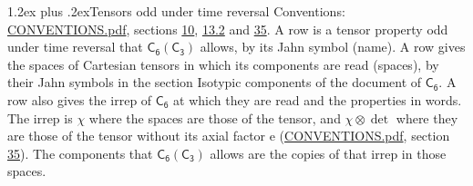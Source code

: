 \documentclass[10pt,a4paper]{article}
\makeatletter
\renewcommand\section{\@startsection{section}{1}{\z@}{-3ex plus -1ex minus -.2ex}%
  {1.2ex plus .2ex}{\normalfont\large\sffamily\bfseries\color{parttitle}}}
\numberwithin{equation}{section}
\newcommand{\grp}[1]{\mathsf{#1}}
\newcommand{\irrprod}{\otimes}
\makeatother
\begin{document}
\section{Tensors odd under time reversal}\label{s:time_odd}
Conventions: \href{../../CONVENTIONS.pdf}{CONVENTIONS.pdf}, sections \href{../../../rotation/CONVENTIONS.pdf\#conv.10}{10}, \href{../../../rotation/CONVENTIONS.pdf\#conv.13.2}{13.2} and \href{../../CONVENTIONS.pdf\#conv.35}{35}.
\leavevmode\label{n:head.name.property}A row is a tensor property odd under time reversal that $\grp{C_{6}}(\grp{C_{3}})$ allows, by its Jahn symbol (name). \label{n:head.spaces}A row gives the spaces of Cartesian tensors in which its components are read (spaces), by their Jahn symbols in the section Isotypic components of the document of \href{../../../rotation/data/pdf/C6.pdf}{$\grp{C_{6}}$}. \label{n:head.properties}A row also gives the irrep of $\grp{C_{6}}$ at which they are read and the properties in words. The irrep is $\chi$ where the spaces are those of the tensor, and $\chi \irrprod \det$ where they are those of the tensor without its axial factor e (\href{../../CONVENTIONS.pdf}{CONVENTIONS.pdf}, section \href{../../CONVENTIONS.pdf\#conv.35}{35}). The components that $\grp{C_{6}}(\grp{C_{3}})$ allows are the copies of that irrep in those spaces.
\end{document}
